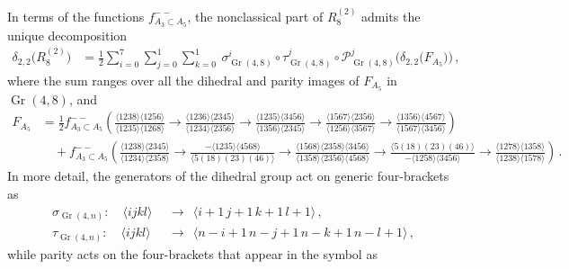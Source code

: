 \documentclass[11pt]{article}
\DeclareMathOperator{\Gr}{Gr}
\begin{document}
In terms of the functions $f_{A_3\subset A_5}^{--}$, the nonclassical part of $R^{(2)}_8$ admits the unique decomposition 
\begin{align}\label{eq:r28A5}
\delta_{2,2} \big(R^{(2)}_8\big) &= \frac{1}{2} \sum_{i = 0}^7 \sum_{j=0}^1 \sum_{k=0}^1 \ \sigma_{\Gr(4,8)}^i \circ \tau_{\Gr(4,8)}^j \circ {\mathcal{P}}_{\Gr(4,8)}^j   \Big(\delta_{2,2} \big(F_{A_5} \big)\Big) \, ,
\end{align}
where the sum ranges over all the dihedral and parity images of $F_{A_5}$ in $\Gr(4,8)$, and 
\begin{align} \label{eq:F_A5}
F_{A_5} &=  \frac12 f_{A_3\subset A_5}^{--} \! \left(\tfrac{\langle 1238\rangle  \langle 1256\rangle }{\langle1235\rangle  \langle 1268\rangle }\! 
    \to \! \tfrac{\langle 1236 \rangle \langle 2345 \rangle}{\langle 1234 \rangle \langle 2356 \rangle} \! 
    \to \! \tfrac{\langle 1235 \rangle \langle 3456 \rangle}{\langle 1356 \rangle \langle 234 5\rangle} \! 
    \to \! \tfrac{\langle 1567 \rangle \langle 2356 \rangle}{\langle 1256 \rangle \langle 3567 \rangle} \! 
    \to \! \tfrac{\langle 1356 \rangle \langle 4567 \rangle}{\langle 1567 \rangle \langle 3456 \rangle}\right)  \\
   &\quad + f_{A_3\subset A_5}^{--}\! \left(\tfrac{\langle 1238 \rangle \langle 2345 \rangle}{\langle 1234 \rangle \langle 2358 \rangle} \! 
    \to \! \tfrac{- \langle 1235 \rangle \langle 4568 \rangle}{\langle 5(18)(23)(46) \rangle} \! 
    \to \!\tfrac{\langle 1568 \rangle \langle 2358 \rangle \langle 3456 \rangle}{\langle 1358 \rangle \langle 2356 \rangle \langle 4568 \rangle} \! 
    \to \!\tfrac{\langle 5(18)(23)(46) \rangle}{- \langle 1258 \rangle \langle 3456 \rangle} \! 
    \to \!\tfrac{\langle 1278 \rangle \langle 1358 \rangle}{\langle 1238 \rangle \langle 1578 \rangle}\right)\, . \nonumber
\end{align}
In more detail, the generators of the dihedral group act on generic four-brackets as
\begin{align} \label{eq:Gr_4n_dihedral_generators}
  \sigma_{\Gr(4,n)} :\quad  \langle i j k l \rangle \ \ &\to \ \ \langle i{+}1 \,  j{+}1 \,  k{+}1 \,  l{+}1 \rangle \, , \\
  \tau_{\Gr(4,n)} :\quad  \langle i j k l \rangle  \ \ &\to \ \  \langle n{-}i{+}1 \, n{-}j{+}1\, n{-}k{+}1 \, n{-}l{+}1 \rangle \, ,
\end{align}
while parity acts on the four-brackets that appear in the symbol as  
\vspace{.7cm}
\begin{align} \label{eq:Gr_4n_parity} \ \end{align}
\end{document}
